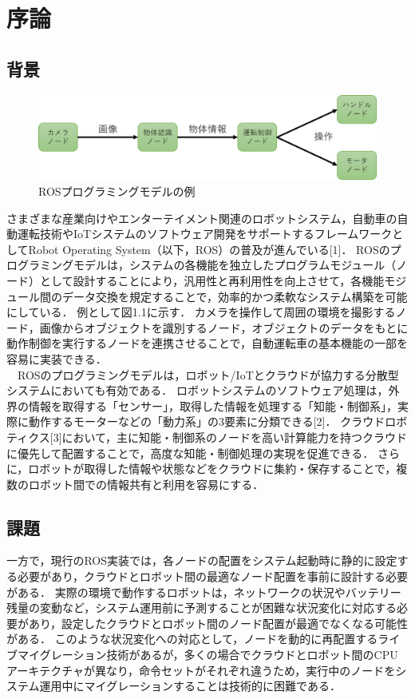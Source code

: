 \chapter{序論}
\section{背景}
\begin{figure}[ht]
    \centering
    \includegraphics[width=15cm]{images/fig1_rosprograming_configuration.png}
    \caption{ROSプログラミングモデルの例}
    \label{fig:ros_programing_model}
\end{figure}
さまざまな産業向けやエンターテイメント関連のロボットシステム，自動車の自動運転技術やIoTシステムのソフトウェア開発をサポートするフレームワークとしてRobot Operating System（以下，ROS）の普及が進んでいる[1]．
ROSのプログラミングモデルは，システムの各機能を独立したプログラムモジュール（ノード）として設計することにより，汎用性と再利用性を向上させて，各機能モジュール間のデータ交換を規定することで，効率的かつ柔軟なシステム構築を可能にしている．
例として図1.1に示す．
カメラを操作して周囲の環境を撮影するノード，画像からオブジェクトを識別するノード，オブジェクトのデータをもとに動作制御を実行するノードを連携させることで，自動運転車の基本機能の一部を容易に実装できる．
\\　ROSのプログラミングモデルは，ロボット/IoTとクラウドが協力する分散型システムにおいても有効である．
ロボットシステムのソフトウェア処理は，外界の情報を取得する「センサー」，取得した情報を処理する「知能・制御系」，実際に動作するモーターなどの「動力系」の3要素に分類できる[2]．
クラウドロボティクス[3]において，主に知能・制御系のノードを高い計算能力を持つクラウドに優先して配置することで，高度な知能・制御処理の実現を促進できる．
さらに，ロボットが取得した情報や状態などをクラウドに集約・保存することで，複数のロボット間での情報共有と利用を容易にする．
\section{課題}
一方で，現行のROS実装では，各ノードの配置をシステム起動時に静的に設定する必要があり，クラウドとロボット間の最適なノード配置を事前に設計する必要がある．
実際の環境で動作するロボットは，ネットワークの状況やバッテリー残量の変動など，システム運用前に予測することが困難な状況変化に対応する必要があり，設定したクラウドとロボット間のノード配置が最適でなくなる可能性がある．
このような状況変化への対応として，ノードを動的に再配置するライブマイグレーション技術があるが，多くの場合でクラウドとロボット間のCPUアーキテクチャが異なり，命令セットがそれぞれ違うため，実行中のノードをシステム運用中にマイグレーションすることは技術的に困難である．
